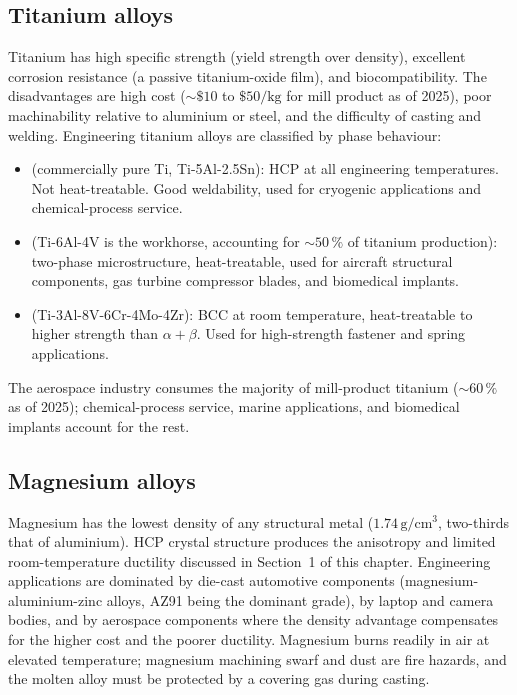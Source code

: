 \subsection{Titanium alloys}

Titanium has high specific strength (yield strength over density),
excellent corrosion resistance (a passive titanium-oxide film), and
biocompatibility. The disadvantages are high cost ($\sim \$10$ to
$\$50/\text{kg}$ for mill product as of 2025), poor machinability
relative to aluminium or steel, and the difficulty of casting and
welding. Engineering titanium alloys are classified by phase
behaviour:

\begin{itemize}[leftmargin=*]
\item {} (commercially pure Ti, Ti-5Al-2.5Sn):
  HCP at all engineering temperatures. Not heat-treatable. Good
  weldability, used for cryogenic applications and chemical-process
  service.
\item {} (Ti-6Al-4V is the workhorse,
  accounting for $\sim 50\,\%$ of titanium production): two-phase
  microstructure, heat-treatable, used for aircraft structural
  components, gas turbine compressor blades, and biomedical
  implants.
\item {} (Ti-3Al-8V-6Cr-4Mo-4Zr): BCC at room
  temperature, heat-treatable to higher strength than $\alpha+\beta$.
  Used for high-strength fastener and spring applications.
\end{itemize}

The aerospace industry consumes the majority of mill-product titanium
($\sim 60\,\%$ as of 2025); chemical-process service, marine
applications, and biomedical implants account for the rest.

\subsection{Magnesium alloys}

Magnesium has the lowest density of any structural metal ($1.74\,
\text{g}/\text{cm}^3$, two-thirds that of aluminium). HCP crystal
structure produces the anisotropy and limited room-temperature
ductility discussed in Section~1 of this chapter. Engineering
applications are dominated by die-cast automotive components
(magnesium-aluminium-zinc alloys, AZ91 being the dominant grade), by
laptop and camera bodies, and by aerospace components where the
density advantage compensates for the higher cost and the
poorer ductility. Magnesium burns readily in air at elevated
temperature; magnesium machining swarf and dust are fire hazards, and
the molten alloy must be protected by a covering gas during casting.

